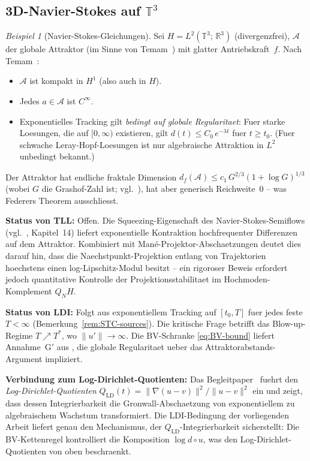 \documentclass[12pt,a4paper]{article}
\theoremstyle{definition}
\theoremstyle{plain}
\theoremstyle{remark}
\newtheorem{example}[definition]{Beispiel}
\begin{document}
\subsection{3D-Navier-Stokes auf $\mathbb{T}^3$}

\begin{example}[Navier-Stokes-Gleichungen]
\label{ex:NS}
Sei $H = L^2(\mathbb{T}^3;\,\mathbb{R}^3)$ (divergenzfrei),
$\mathcal{A}$ der globale Attraktor (im Sinne von Temam~\cite{Temam1997}) mit glatter
Antriebskraft~$f$.  Nach Temam~\cite{Temam1997}:
\begin{itemize}
  \item $\mathcal{A}$ ist kompakt in $H^1$ (also auch in $H$).
  \item Jedes $a \in \mathcal{A}$ ist $C^\infty$.
  \item Exponentielles Tracking gilt \emph{bedingt auf globale
    Regularitaet}: Fuer starke Loesungen, die auf $[0,\infty)$
    existieren, gilt $d(t) \le C_0\,e^{-\lambda t}$ fuer $t \ge t_0$.
    (Fuer schwache Leray-Hopf-Loesungen ist nur algebraische
    Attraktion in $L^2$ unbedingt bekannt.)
\end{itemize}

Der Attraktor hat endliche fraktale Dimension
$d_f(\mathcal{A}) \le c_1\,G^{2/3}(1+\log G)^{1/3}$
(wobei $G$ die Grashof-Zahl ist;
vgl.~\cite{ConstantinFoiasTemam1985}), hat aber generisch
Reichweite~$0$ -- was Federers Theorem ausschliesst.

\medskip\noindent
\textbf{Status von TLL:}\; Offen.  Die Squeezing-Eigenschaft des
Navier-Stokes-Semiflows (vgl.~\cite{FoiasManleyRosaTemam2001},
Kapitel~14) liefert exponentielle Kontraktion hochfrequenter
Differenzen auf dem Attraktor.  Kombiniert mit
Man\'e-Projektor-Abschaetzungen deutet dies darauf hin, dass die
Naechstpunkt-Projektion entlang von Trajektorien hoechstens einen
log-Lipschitz-Modul besitzt -- ein rigoroser Beweis erfordert jedoch
quantitative Kontrolle der Projektionsstabilitaet im
Hochmoden-Komplement $Q_N H$.

\medskip\noindent
\textbf{Status von LDI:}\; Folgt aus exponentiellem Tracking
auf $[t_0, T]$ fuer jedes feste $T < \infty$
(Bemerkung~\ref{rem:STC-sources}).  Die kritische Frage betrifft das
Blow-up-Regime $T \nearrow T^*$, wo $\|u'\| \to \infty$.
Die BV-Schranke \eqref{eq:BV-bound} liefert Annahme~G$'$ aus
\cite{FST-NS2026}, die globale Regularitaet ueber das
Attraktorabstands-Argument impliziert.

\medskip\noindent
\textbf{Verbindung zum Log-Dirichlet-Quotienten:}\;
Das Begleitpaper~\cite{FST-NS2026} fuehrt den
\emph{Log-Dirichlet-Quotienten}
$Q_{\mathrm{LD}}(t) = \|\nabla(u-v)\|^2 / \|u-v\|^2$ ein und zeigt,
dass dessen Integrierbarkeit die Gronwall-Abschaetzung von
exponentiellem zu algebraischem Wachstum transformiert. Die
LDI-Bedingung der vorliegenden Arbeit liefert genau den Mechanismus,
der $Q_{\mathrm{LD}}$-Integrierbarkeit sicherstellt: Die BV-Kettenregel
kontrolliert die Komposition $\log d \circ u$, was den
Log-Dirichlet-Quotienten von oben beschraenkt.
\end{example}
\end{document}
